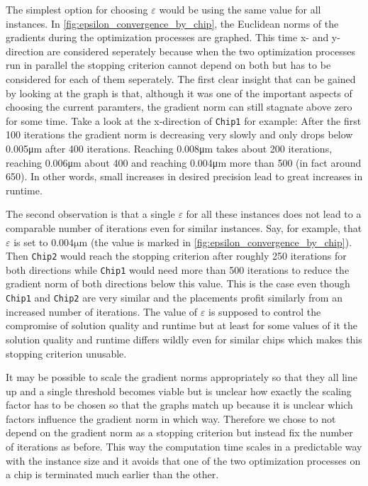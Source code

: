 The simplest option for choosing \(\varepsilon\) would be using the same value for all instances.
In \cref{fig:epsilon_convergence_by_chip}, the Euclidean norms of the gradients during the optimization processes are graphed.
This time x- and y-direction are considered seperately because when the two optimization processes run in parallel
the stopping criterion cannot depend on both but has to be considered for each of them seperately.
The first clear insight that can be gained by looking at the graph is that,
although it was one of the important aspects of choosing the current paramters,
the gradient norm can still stagnate above zero for some time.
Take a look at the x-direction of \texttt{Chip1} for example:
After the first 100 iterations the gradient norm is decreasing very slowly
and only drops below 0.005\si{\micro\meter} after 400 iterations.
Reaching 0.008\si{\micro\meter} takes about 200 iterations,
reaching 0.006\si{\micro\meter} about 400
and reaching 0.004\si{\micro\meter} more than 500 (in fact around 650).
In other words, small increases in desired precision lead to great increases in runtime.

The second observation is that a single \(\varepsilon\) for all these instances
does not lead to a comparable number of iterations even for similar instances.
Say, for example, that \(\varepsilon\) is set to \(0.004\si{\micro\meter}\) (the value is marked in \cref{fig:epsilon_convergence_by_chip}).
Then \texttt{Chip2} would reach the stopping criterion after roughly 250 iterations for both directions
while \texttt{Chip1} would need more than 500 iterations to reduce the gradient norm of both directions below this value.
This is the case even though \texttt{Chip1} and \texttt{Chip2} are very similar
and the placements profit similarly from an increased number of iterations.
The value of \(\varepsilon\) is supposed to control the compromise of solution quality and runtime
but at least for some values of it the solution quality and runtime differs wildly even for similar chips
which makes this stopping criterion unusable.

It may be possible to scale the gradient norms appropriately so that they all line up
and a single threshold becomes viable
but is unclear how exactly the scaling factor has to be chosen so that the graphs match up
because it is unclear which factors influence the gradient norm in which way.
Therefore we chose to not depend on the gradient norm as a stopping criterion but instead
fix the number of iterations as before.
This way the computation time scales in a predictable way with the instance size
and it avoids that one of the two optimization processes on a chip is terminated
much earlier than the other.

